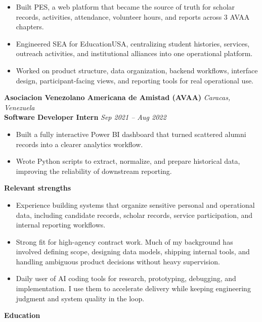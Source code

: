 \documentclass[11pt]{article}
\begin{document}
\begin{itemize}
    \item Built PES, a web platform that became the source of truth for scholar records, activities, attendance, volunteer hours, and reports across 3 AVAA chapters.
    \item Engineered SEA for EducationUSA, centralizing student histories, services, outreach activities, and institutional alliances into one operational platform.
    \item Worked on product structure, data organization, backend workflows, interface design, participant-facing views, and reporting tools for real operational use.
\end{itemize}
\vspace{10pt}
\textbf{Asociacion Venezolano Americana de Amistad (AVAA)} \hfill \textit{Caracas, Venezuela} \\
\textbf{Software Developer Intern} \hfill \textit{Sep 2021 -- Aug 2022}
\begin{itemize}
    \item Built a fully interactive Power BI dashboard that turned scattered alumni records into a clearer analytics workflow.
    \item Wrote Python scripts to extract, normalize, and prepare historical data, improving the reliability of downstream reporting.
\end{itemize}
\vspace{8pt}
\begin{center}
    \textbf{Relevant strengths}
\end{center}
\vspace{-4pt}
\begin{itemize}
    \item Experience building systems that organize sensitive personal and operational data, including candidate records, scholar records, service participation, and internal reporting workflows.
    \item Strong fit for high-agency contract work. Much of my background has involved defining scope, designing data models, shipping internal tools, and handling ambiguous product decisions without heavy supervision.
    \item Daily user of AI coding tools for research, prototyping, debugging, and implementation. I use them to accelerate delivery while keeping engineering judgment and system quality in the loop.
\end{itemize}
\vspace{8pt}
\begin{center}
    \textbf{Education}
\end{center}
\end{document}
